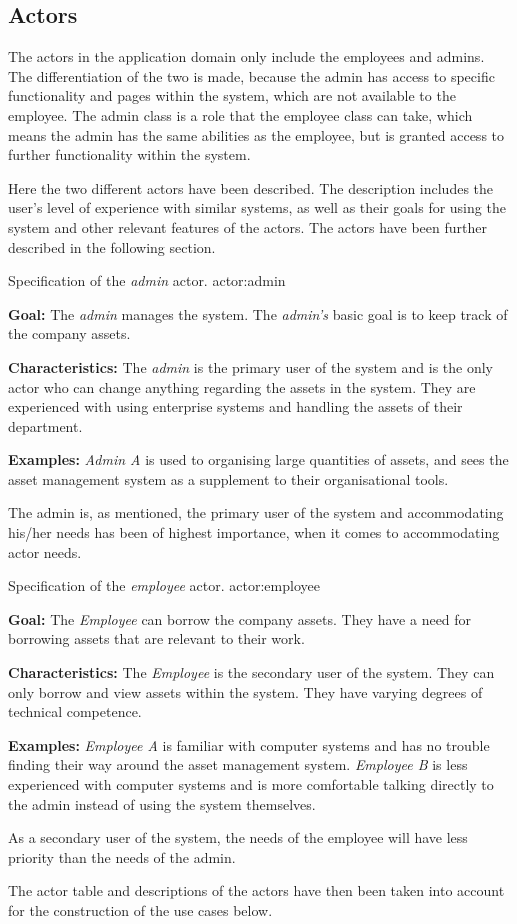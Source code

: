 \subsection{Actors} \label{scc:actors}
The actors in the application domain only include the employees and admins. The differentiation of the two is made, because the admin has access to specific functionality and pages within the system, which are not available to the employee. The admin class is a role that the employee class can take, which means the admin has the same abilities as the employee, but is granted access to further functionality within the system.
\par
Here the two different actors have been described. The description includes the user's level of experience with similar systems, as well as their goals for using the system and other relevant features of the actors. The actors have been further described in the following section.

    {Specification of the \textit{admin} actor.}
    {actor:admin}
    {
        \textbf{Goal:} The \textit{admin} manages the system. The \textit{admin's} basic goal is to keep track of the company assets.
        \vskip 0.2cm
        
        \textbf{Characteristics:} The \textit{admin} is the primary user of the system and is the only actor who can change anything regarding the assets in the system. They are experienced with using enterprise systems and handling the assets of their department.
        \vskip 0.2cm
        
        \textbf{Examples:} \textit{Admin A} is used to organising large quantities of assets, and sees the asset management system as a supplement to their organisational tools.
    }

The admin is, as mentioned, the primary user of the system and accommodating his/her needs has been of highest importance, when it comes to accommodating actor needs.

    {Specification of the \textit{employee} actor.}
    {actor:employee}
    {
        \textbf{Goal:} The \textit{Employee} can borrow the company assets. They have a need for borrowing assets that are relevant to their work.
        \vskip 0.2cm
        
        \textbf{Characteristics:} The \textit{Employee} is the secondary user of the system. They can only borrow and view assets within the system. They have varying degrees of technical competence.
        \vskip 0.2cm
        
        \textbf{Examples:} \textit{Employee A} is familiar with computer systems and has no trouble finding their way around the asset management system.
        \vskip 0.1cm
        \textit{Employee B} is less experienced with computer systems and is more comfortable talking directly to the admin instead of using the system themselves. 
    }
As a secondary user of the system, the needs of the employee will have less priority than the needs of the admin.
\par
The actor table and descriptions of the actors have then been taken into account for the construction of the use cases below.